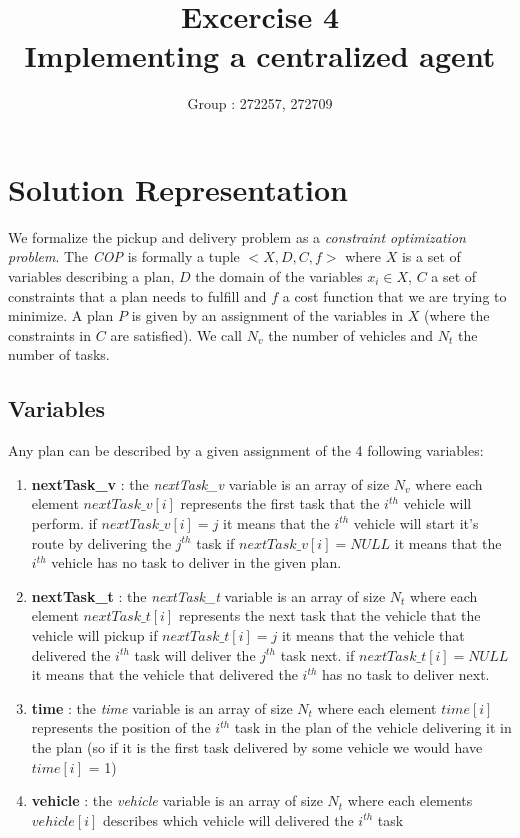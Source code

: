\documentclass[11pt]{article}
\title{\bf Excercise 4\\ Implementing a centralized agent}
\author{Group \textnumero : 272257, 272709}
\begin{document}
\maketitle

\section{Solution Representation}

We formalize the pickup and delivery problem as a \textit{constraint optimization problem}. The \textit{COP} is formally a tuple $< X, D, C, f >$ where $X$ is a set of variables describing a plan, $D$ the domain of the variables $x_i \in X$, $C$ a set of constraints that a plan needs to fulfill and $f$ a cost function that we are trying to minimize. A plan $P$ is given by an assignment of the variables in $X$ (where the constraints in $C$ are satisfied). We call $N_v$ the number of vehicles and $N_t$ the number of tasks.


\subsection{Variables}
Any plan can be described by a given assignment of the 4 following variables:
\begin{enumerate}
    \item \textbf{nextTask\_v} : the \textit{nextTask\_v} variable is an array of size $N_v$ where each element $nextTask\_v[i]$ represents the first task that the $i^{th}$ vehicle will perform.
    \subitem if $nextTask\_v[i] = j$ it means that the $i^{th}$ vehicle will start it's route by delivering the $j^{th}$ task
    \subitem if $nextTask\_v[i] = NULL$  it means that the $i^{th}$ vehicle has no task to deliver in the given plan.
    \item \textbf{nextTask\_t} : the \textit{nextTask\_t} variable is an array of size $N_t$ where each element $nextTask\_t[i]$ represents the next task that the vehicle that the vehicle will pickup
    \subitem if $nextTask\_t[i] = j$ it means that the vehicle that delivered the $i^{th}$ task will deliver the $j^{th}$ task next.
    \subitem if $nextTask\_t[i] = NULL$  it means that the vehicle that delivered the $i^{th}$ has no task to deliver next.
    \item \textbf{time} : the \textit{time} variable is an array of size $N_t$ where each element $time[i]$ represents the position of the $i^{th}$ task in the plan of the vehicle delivering it in the plan (so if it is the first task delivered by some vehicle we would have $time[i]$ = 1)
    \item \textbf{vehicle} : the \textit{vehicle} variable is an array of size $N_t$ where each elements $vehicle[i]$ describes which vehicle will delivered the $i^{th}$ task
\end{enumerate}
\end{document}
